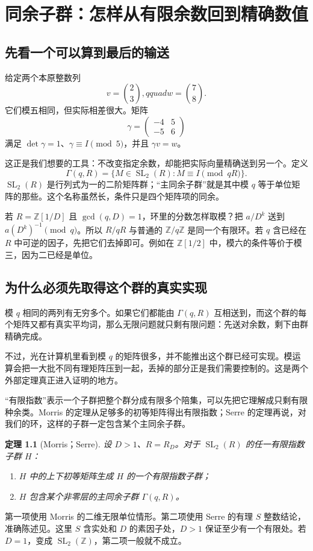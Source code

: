 \documentclass[11pt,a4paper,oneside,openany]{book}
\newcommand{\Z}{\mathbb Z}
\newcommand{\SL}{\operatorname{SL}}
\newtheorem{theorem}{定理}[chapter]
\theoremstyle{definition}
\numberwithin{equation}{chapter}
\begin{document}
\chapter{同余子群：怎样从有限余数回到精确数值}\label{ch:congruence}
\section{先看一个可以算到最后的输送}
给定两个本原整数列
\[v=\binom23,qquad w=\binom78.
\]
它们模五相同，但实际相差很大。矩阵
\[\gamma=\begin{pmatrix}-4&5\\-5&6\end{pmatrix}
\]
满足 $\det\gamma=1$、$\gamma\equiv I\pmod5$，并且 $\gamma v=w$。

这正是我们想要的工具：不改变指定余数，却能把实际向量精确送到另一个。定义
\[\Gamma(q,R)=\{M\in\SL_2(R):M\equiv I\pmod{qR}\}.
\]
$\SL_2(R)$ 是行列式为一的二阶矩阵群；“主同余子群”就是其中模 $q$ 等于单位矩阵的那些。这个名称虽然长，条件只是四个矩阵项的同余。

若 $R=\Z[1/D]$ 且 $\gcd(q,D)=1$，环里的分数怎样取模？把 $a/D^k$ 送到 $a(D^k)^{-1}\pmod q$。所以 $R/qR$ 与普通的 $\Z/q\Z$ 是同一个有限环。若 $q$ 含已经在 $R$ 中可逆的因子，先把它们去掉即可。例如在 $\Z[1/2]$ 中，模六的条件等价于模三，因为二已经是单位。

\section{为什么必须先取得这个群的真实实现}
模 $q$ 相同的两列有无穷多个。如果它们都能由 $\Gamma(q,R)$ 互相送到，而这个群的每个矩阵又都有真实平均词，那么无限问题就只剩有限问题：先送对余数，剩下由群精确完成。

不过，光在计算机里看到模 $q$ 的矩阵很多，并不能推出这个群已经可实现。模运算会把一大批不同有理矩阵压到一起，丢掉的部分正是我们需要控制的。这是两个外部定理真正进入证明的地方。

“有限指数”表示一个子群把整个群分成有限多个陪集，可以先把它理解成只剩有限种余类。Morris 的定理从足够多的初等矩阵得出有限指数；Serre 的定理再说，对我们的环，这样的子群一定包含某个主同余子群。
\begin{theorem}[Morris；Serre]\label{thm:arithmetic-external}
设 $D>1$、$R=R_D$。对于 $\SL_2(R)$ 的任一有限指数子群 $H$：
\begin{enumerate}
\item $H$ 中的上下初等矩阵生成 $H$ 的一个有限指数子群；
\item $H$ 包含某个非零层的主同余子群 $\Gamma(q,R)$。
\end{enumerate}
\end{theorem}
第一项使用 Morris\cite[Theorem 6.1(2)]{morris} 的二维无限单位情形。第二项使用 Serre\cite{serre} 的有理 $S$ 整数结论，准确陈述见\cite[pp.308--309]{prasad}。这里 $S$ 含实处和 $D$ 的素因子处，$D>1$ 保证至少有一个有限处。若 $D=1$，变成 $\SL_2(\Z)$，第二项一般就不成立。
\end{document}
